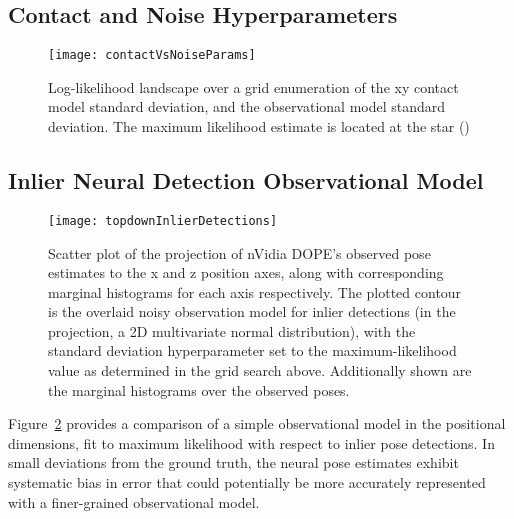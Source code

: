 \subsection{Contact and Noise Hyperparameters}

\begin{figure}[h]
  \texttt{[image: contactVsNoiseParams]}
  \caption{
    Log-likelihood landscape over a grid enumeration of the xy contact model standard deviation, and the observational model standard deviation. The maximum likelihood estimate is located at the star ()
  }
  \label{fig:contactVsNoiseParams}
\end{figure}

\todo

\subsection{Inlier Neural Detection Observational Model}

\begin{figure}[h]
  \texttt{[image: topdownInlierDetections]}
  \caption{
    Scatter plot of the projection of nVidia DOPE's observed pose estimates to the x and z position axes, along with corresponding marginal histograms for each axis respectively.
    The plotted contour is the overlaid noisy observation model for inlier detections (in the projection, a 2D multivariate normal distribution), with the standard deviation hyperparameter set to the maximum-likelihood value as determined in the grid search above.
    Additionally shown are the marginal histograms over the observed poses.
  }
  \label{fig:topdownInlierDetections}
\end{figure}

Figure~\ref{fig:topdownInlierDetections} provides a comparison of a simple observational model in the positional dimensions, fit to maximum likelihood with respect to inlier pose detections. In small deviations from the ground truth, the neural pose estimates exhibit systematic bias in error that could potentially be more accurately represented with a finer-grained observational model.
